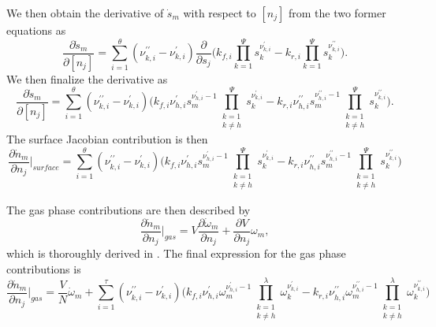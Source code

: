 \documentclass[12pt]{ussci}
\def\gasreactions{\tau}
\def\surfreactions{\theta}
\def\nspecies{\Psi}
\def\gasspecies{\lambda}
\begin{document}
We then obtain the derivative of $\dot{s}_m$ with respect to $[n_j]$ from the two former equations as
\begin{equation}
        \frac{\partial \dot{s}_{m}}{\partial [n_j]}  = \sum_{i=1}^{\surfreactions}{(\nu^{\prime\prime}_{k,i}-\nu^{\prime}_{k,i})\frac{\partial}{\partial s_j}\bigg(k_{f,i}\prod_{k=1}^{\nspecies}{s_k^{\nu^{\prime}_{k,i}}} - k_{r,i}\prod_{k=1}^{\nspecies}{s_k^{\nu^{\prime\prime}_{k,i}}}\bigg)}.
\end{equation}
We then finalize the derivative as
\begin{equation}
        \frac{\partial \dot{s}_{m}}{\partial [n_j]}  = \sum_{i=1}^{\surfreactions}{(\nu^{\prime\prime}_{k,i}-\nu^{\prime}_{k,i})\bigg(k_{f,i}\nu^\prime_{h,i}s_{m}^{\nu^\prime_{h,i}-1}\prod_{\substack{k = 1 \\ k \neq h}}^{\nspecies}{s_k^{\nu^{\prime}_{k,i}}} - k_{r,i}\nu^{\prime\prime}_{h,i}s_{m}^{\nu^{\prime\prime}_{h,i}-1}\prod_{\substack{k = 1 \\ k \neq h}}^{\nspecies}{s_k^{\nu^{\prime\prime}_{k,i}}}\bigg)}.
\end{equation}
The surface Jacobian contribution is then
\begin{equation}
    \label{surf_contrib}
    \frac{\partial \dot{n}_{m}}{\partial n_j}\Big\vert_{surface} = \sum_{i=1}^{\surfreactions}{(\nu^{\prime\prime}_{k,i}-\nu^{\prime}_{k,i})\bigg(k_{f,i}\nu^\prime_{h,i}s_{m}^{\nu^\prime_{h,i}-1}\prod_{\substack{k = 1 \\ k \neq h}}^{\nspecies}{s_k^{\nu^{\prime}_{k,i}}} - k_{r,i}\nu^{\prime\prime}_{h,i}s_{m}^{\nu^{\prime\prime}_{h,i}-1}\prod_{\substack{k = 1 \\ k \neq h}}^{\nspecies}{s_k^{\nu^{\prime\prime}_{k,i}}}\bigg)}
\end{equation}

The gas phase contributions are then described by
\begin{equation}
    \frac{\partial \dot{n}_{m}}{\partial n_j}\Big\vert_{gas} = V\frac{\partial \dot{\omega}_{m}}{\partial n_j} + \frac{\partial V}{\partial n_j}\omega_{m},
\end{equation}
which is thoroughly derived in \cite{walker2022generalized}.
The final expression for the gas phase contributions is
\begin{equation}
    \label{gas_contrib}
    \frac{\partial \dot{n}_{m}}{\partial n_j}\Big\vert_{gas} = \frac{V}{N}\dot{\omega}_{m} + \sum_{i=1}^{\gasreactions}{(\nu^{\prime\prime}_{k,i}-\nu^{\prime}_{k,i})\bigg(k_{f,i}\nu^\prime_{h,i}\omega_{m}^{\nu^\prime_{h,i}-1}\prod_{\substack{k = 1 \\ k \neq h}}^{\gasspecies}{\omega_k^{\nu^{\prime}_{k,i}}} - k_{r,i}\nu^{\prime\prime}_{h,i}\omega_{m}^{\nu^{\prime\prime}_{h,i}-1}\prod_{\substack{k = 1 \\ k \neq h}}^{\gasspecies}{\omega_k^{\nu^{\prime\prime}_{k,i}}}\bigg)}
\end{equation}
\end{document}

